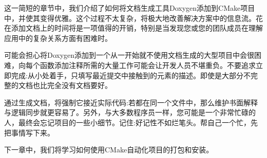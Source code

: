 
这一简短的章节中，我们介绍了如何将文档生成工具Doxygen添加到CMake项目中，并使其变得优雅。这个过程不太复杂，将极大地改善解决方案中的信息流。花在添加文档上的时间将是一项值得的开销，特别是当发现您或您的团队成员在理解应用中的复杂关系方面有困难时。

可能会担心将Doxygen添加到一个从一开始就不使用文档生成的大型项目中会很困难，向每个函数添加注释所需的大量工作可能会让开发人员不堪重负。不要追求立即完成:从小处着手，只填写最近提交中接触到的元素的描述。即使是大部分不完整的文档也比完全没有文档要好。

通过生成文档，将强制它接近实际代码:若都在同一个文件中，那么维护书面解释与逻辑同步就更容易了。另外，与大多数程序员一样，您可能是一个非常忙碌的人，最终会忘记项目的一些小细节。记住:好记性不如烂笔头。帮自己一个忙，先把事情写下来。

下一章中，我们将学习如何使用CMake自动化项目的打包和安装。



